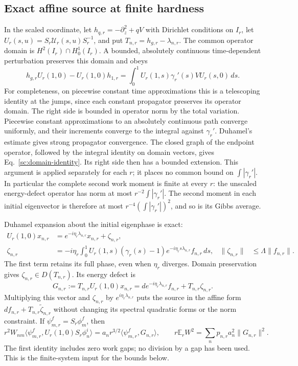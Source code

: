 \documentclass[aps,prl,reprint,superscriptaddress,longbibliography]{revtex4-2}
\begin{document}
\subsection{Exact affine source at finite hardness}
\label{sc:finite-source}

In the scaled coordinate, let $h_{q,r}=-\partial_z^2+qV$ with Dirichlet
conditions on $I_r$, let $U_r(s,u)=S_r\mathcal U_r(s,u)S_r^{-1}$, and put
$T_{n,r}=h_{g,r}-\lambda_{n,r}$. The common operator domain is
$H^2(I_r)\cap H_0^1(I_r)$. A bounded, absolutely continuous
time-dependent perturbation preserves this domain and obeys
\begin{equation}
 h_{g,r}U_r(1,0)-U_r(1,0)h_{1,r}
 =\int_0^1U_r(1,s)\gamma_r'(s)VU_r(s,0)\,ds.
 \label{sc:domain-identity}
\end{equation}
For completeness, on piecewise constant time approximations this is a
telescoping identity at the jumps, since each constant propagator
preserves its operator domain. The right side is bounded in operator
norm by the total variation. Piecewise constant approximations to an
absolutely continuous path converge uniformly, and their increments
converge to the integral against $\gamma_r'$. Duhamel's estimate gives
strong propagator convergence. The closed graph of the endpoint
operator, followed by the integral identity on domain vectors, gives
Eq.~\eqref{sc:domain-identity}. Its right side then has a bounded
extension. This argument is applied separately for each $r$; it places
no common bound on $\int|\gamma_r'|$.
In particular the complete second work moment is finite at every $r$:
the unscaled energy-defect operator has norm at most
$r^{-2}\int|\gamma_r'|$. The second moment in each initial eigenvector is
therefore at most $r^{-4}(\int|\gamma_r'|)^2$, and so is its Gibbs average.

Duhamel expansion about the initial eigenphase is exact:
\begin{align}
 U_r(1,0)x_{n,r}&=e^{-i\eta_r\lambda_{n,r}}x_{n,r}+\zeta_{n,r},\\
 \zeta_{n,r}&=-i\eta_r\int_0^1U_r(1,s)(\gamma_r(s)-1)
 e^{-i\eta_rs\lambda_{n,r}}f_{n,r}\,ds,
 &\|\zeta_{n,r}\|&\le\Lambda\|f_{n,r}\|.
 \label{sc:duhamel}
\end{align}
The first term retains its full phase, even when $\eta_r$ diverges.
Domain preservation gives $\zeta_{n,r}\in D(T_{n,r})$. Its energy defect is
\begin{equation}
 G_{n,r}:=T_{n,r}U_r(1,0)x_{n,r}
 =d e^{-i\eta_r\lambda_{n,r}}f_{n,r}+T_{n,r}\zeta_{n,r}.
 \label{sc:finite-affine}
\end{equation}
Multiplying this vector and $\zeta_{n,r}$ by
$e^{i\eta_r\lambda_{n,r}}$ puts the source in the affine form
$df_{n,r}+T_{n,r}\widetilde\zeta_{n,r}$ without changing its spectral
quadratic forms or the norm constraint. If
$\psi_{m,r}^f=S_r\phi_m^f$, then
\begin{equation}
 r^2W_{nm}\langle\psi_{m,r}^f,U_r(1,0)S_r\phi_n^i\rangle
 =a_nr^{3/2}\langle\psi_{m,r}^f,G_{n,r}\rangle,
 \qquad
 r\mathbb E_rW^2=\sum_np_{n,r}a_n^2\|G_{n,r}\|^2.
 \label{sc:exact-tpm-source}
\end{equation}
The first identity includes zero work gaps; no division by a gap has
been used. This is the finite-system input for the bounds below.
\end{document}
